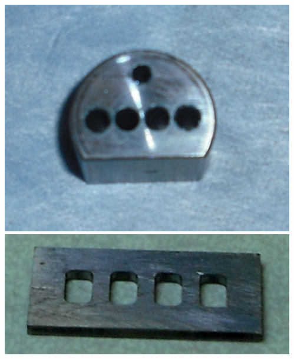 \documentclass[10pt, xcolor=x11names, compress, handout]{beamer}
\begin{document}
\begin{frame}
\begin{columns}
\begin{column}{0.25\linewidth}
\begin{center}
        \includegraphics[width=\linewidth]{JM/sampleholder.jpg}\\[1ex]
        \includegraphics[width=0.67\linewidth]{JM/justslits.jpg}
      \end{center}
    \end{column}
    \begin{column}{0.35\linewidth}

\end{column}
\end{columns}
\end{frame}
\end{document}
